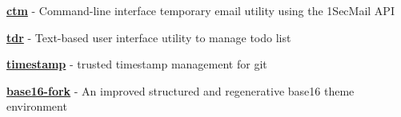 
\begin{cvparagraph}


\hfill
\begin{cvitems}

\item{\href{https://github.com/khuei/ctm}{\textbf{ctm}} - Command-line interface temporary email utility using the 1SecMail API}
\item{\href{https://github.com/khuei/tdr}{\textbf{tdr}} - Text-based user interface utility to manage todo list}
\item{\href{https://github.com/khuei/timestamp}{\textbf{timestamp}} - trusted timestamp management for git}
\item{\href{https://github.com/base16-fork}{\textbf{base16-fork}} - An improved structured and regenerative base16 theme environment}

\end{cvitems}

\end{cvparagraph}
